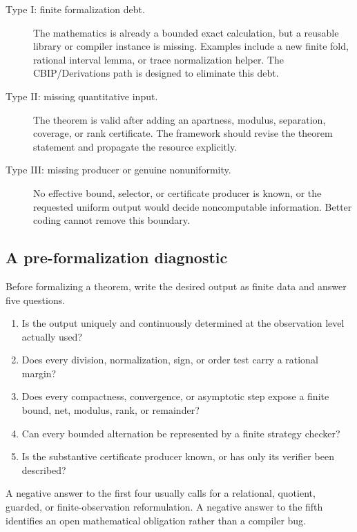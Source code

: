 \begin{description}
\item[Type I: finite formalization debt.] The mathematics is already a bounded exact calculation, but a reusable  library or compiler instance is missing.  Examples include a new finite fold, rational interval lemma, or trace normalization helper.  The CBIP/Derivations path is designed to eliminate this debt.
\item[Type II: missing quantitative input.] The theorem is valid after adding an apartness, modulus, separation, coverage, or rank certificate.  The framework should revise the theorem statement and propagate the resource explicitly.
\item[Type III: missing producer or genuine nonuniformity.] No effective bound, selector, or certificate producer is known, or the requested uniform output would decide noncomputable information.  Better coding cannot remove this boundary.
\end{description}

\subsection{A pre-formalization diagnostic}

Before formalizing a theorem, write the desired output as finite data and answer five questions.

\begin{enumerate}
\item Is the output uniquely and continuously determined at the observation level actually used?
\item Does every division, normalization, sign, or order test carry a rational margin?
\item Does every compactness, convergence, or asymptotic step expose a finite bound, net, modulus, rank, or remainder?
\item Can every bounded alternation be represented by a finite strategy checker?
\item Is the substantive certificate producer known, or has only its verifier been described?
\end{enumerate}

A negative answer to the first four usually calls for a relational, quotient, guarded, or finite-observation reformulation.  A negative answer to the fifth identifies an open mathematical obligation rather than a compiler bug.
